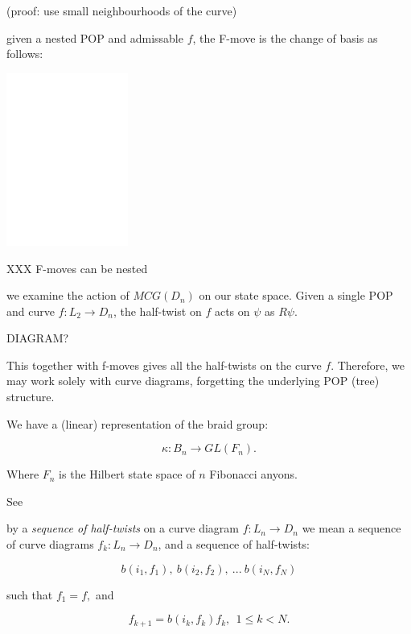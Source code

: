 \documentclass[12pt,a4paper]{article}
\begin{document}
(proof: use small neighbourhoods of the curve)

 given a nested POP and admissable $f$,
the F-move is the change of basis as follows:

\begin{center}
\includegraphics[width=0.3\textwidth]{POP-4.eps}
\end{center}

XXX F-moves can be nested

 we examine the action of $MCG(D_n)$
on our state space. Given a single POP and curve $f:L_2\to D_n$,
the half-twist on $f$ acts on $\psi$ as $R\psi$.

DIAGRAM?

This together with f-moves gives all the half-twists on
the curve $f$. Therefore, we may work solely with curve
diagrams, forgetting the underlying POP (tree) structure.

We have a (linear) representation of the braid group:

    $$ \kappa : B_n \to GL(F_n).$$

Where $F_n$ is the Hilbert state space of $n$ Fibonacci anyons.

See \cite{Pfeifer12, Pfeifer14}




 by a {\it sequence of half-twists} on a curve
diagram $f:L_n\to D_n$ we mean a
sequence of curve diagrams $f_k: L_n\to D_n$, and a sequence of half-twists:

        $$ b(i_1, f_1),\ b(i_2, f_2),\ ...\ b(i_N, f_N) $$

such that $f_1=f,$ and

        $$ f_{k+1} = b(i_k, f_k) f_k,\ \  \text{} 1\leq k<N.$$
\end{document}
